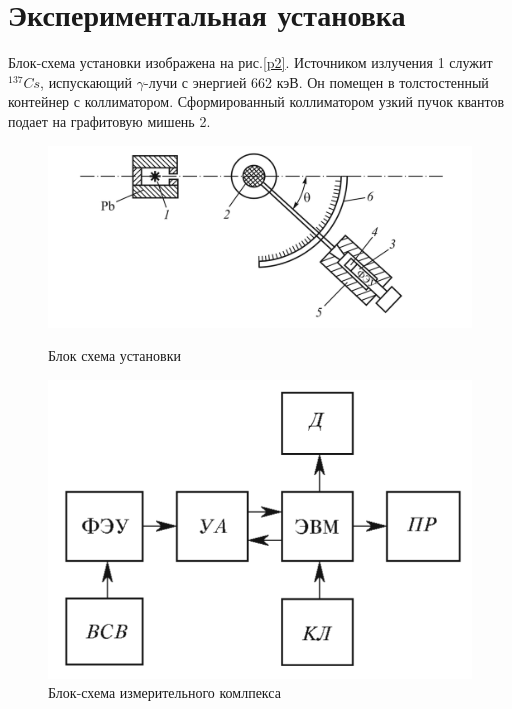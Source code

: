 \documentclass[a4paper]{article}
\begin{document}
\section{Экспериментальная установка}

Блок-схема установки изображена на рис.\ref{p2}. Источником излучения 1 служит $^{137}Cs$, испускающий $\gamma$-лучи с энергией 
662 кэВ. Он помещен в толстостенный контейнер с коллиматором. Сформированный коллиматором узкий пучок квантов подает на графитовую 
мишень 2.

\begin{figure}[h]
	\begin{center}
	\begin{minipage}[h]{0.5\linewidth}
	\includegraphics[width=1\linewidth]{p2.png}
	\caption{Блок схема установки} %
	\label{p2} %
	\end{minipage}
	\hfill 
	\begin{minipage}[h]{0.3\linewidth}
	\includegraphics[width=1\linewidth]{p3.png}
	\caption{Блок-схема измерительного комлпекса}
	\label{p3}
	\end{minipage}
	\end{center}
\end{figure}
\end{document}
